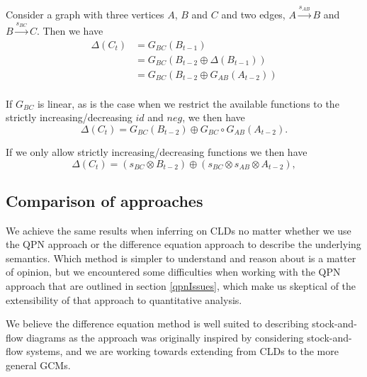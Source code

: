 Consider a graph with three vertices $A$, $B$ and $C$ and two edges,
$A\xrightarrow{s_{AB}} B$ and $B\xrightarrow{s_{BC}} C$.
%
Then we have
\begin{align*}
\Delta(C_t) &= G_{BC}(B_{t-1})\\
&= G_{BC}(B_{t-2} \oplus \Delta(B_{t-1}))\\
&= G_{BC}(B_{t-2} \oplus G_{AB}(A_{t-2}))\\
\end{align*}

If $G_{BC}$ is linear, as is the case when we restrict the available
functions to the strictly increasing/decreasing $id$ and $neg$, we
then have
%
\[\Delta(C_t) = G_{BC}(B_{t-2})\oplus G_{BC}\circ G_{AB}(A_{t-2}).\]

If we only allow strictly increasing/decreasing functions we then have
%
\[\Delta(C_t) = (s_{BC}\otimes B_{t-2})\oplus (s_{BC}\otimes
  s_{AB}\otimes A_{t-2}),\]

\subsection{Comparison of approaches}

We achieve the same results when inferring on CLDs no matter whether
we use the QPN approach or the difference equation approach to
describe the underlying semantics.
%
Which method is simpler to understand and reason about is a matter of
opinion, but we encountered some difficulties when working with the
QPN approach that are outlined in section \ref{qpnIssues}, which make
us skeptical of the extensibility of that approach to quantitative
analysis.

We believe the difference equation method is well suited to describing
stock-and-flow diagrams as the approach was originally inspired by
considering stock-and-flow systems, and we are working towards
extending from CLDs to the more general GCMs.
